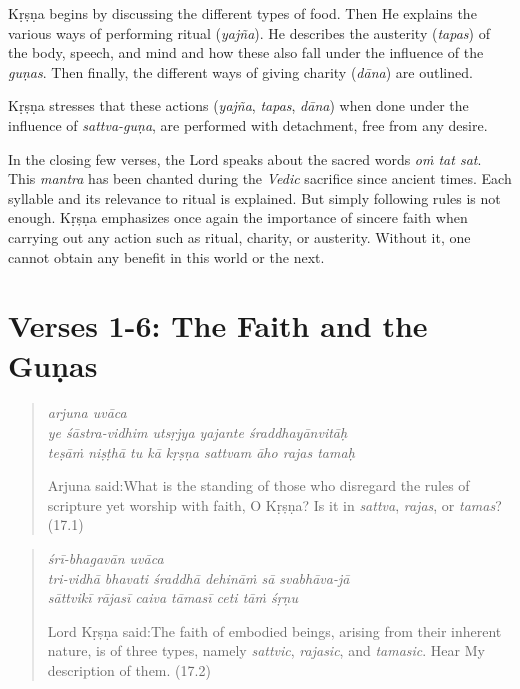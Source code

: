\documentclass[12pt, twoside, openright]{memoir}
\begin{document}
Kṛṣṇa begins by discussing the different types of food. Then He explains the various ways of performing ritual (\textit{yajña}). He describes the austerity (\textit{tapas}) of the body, speech, and mind and how these also fall under the influence of the \textit{guṇas}. Then finally, the different ways of giving charity (\textit{dāna}) are outlined.

Kṛṣṇa stresses that these actions (\textit{yajña}, \textit{tapas}, \textit{dāna}) when done under the influence of \textit{sattva-guṇa}, are performed with detachment, free from any desire.

In the closing few verses, the Lord speaks about the sacred words \textit{oṁ tat sat}. This \textit{mantra} has been chanted during the \textit{Vedic} sacrifice since ancient times. Each syllable and its relevance to ritual is explained. But simply following rules is not enough. Kṛṣṇa emphasizes once again the importance of sincere faith when carrying out any action such as ritual, charity, or austerity. Without it, one cannot obtain any benefit in this world or the next.

\section{Verses 1-6: The Faith and the Guṇas}\label{sec-verses-1-6-the-faith-and-the-gunas}


\par
\begin{verse}
\textit{arjuna uvāca} \\
\textit{ye śāstra-vidhim utsṛjya yajante śraddhayānvitāḥ} \\
\textit{teṣāṁ niṣṭhā tu kā kṛṣṇa sattvam āho rajas tamaḥ}

\noindent \quad Arjuna said:\linebreak What is the standing of those who disregard the rules of scripture yet worship with faith, O Kṛṣṇa? Is it in \textit{sattva}, \textit{rajas}, or \textit{tamas}? (17.1)
\end{verse}
\par



\par
\begin{verse}
\textit{śrī-bhagavān uvāca} \\
\textit{tri-vidhā bhavati śraddhā dehināṁ sā svabhāva-jā} \\
\textit{sāttvikī rājasī caiva tāmasī ceti tāṁ śṛṇu}

\noindent Lord Kṛṣṇa said:\linebreak The faith of embodied beings, arising from their inherent nature, is of three types, namely \textit{sattvic}, \textit{rajasic}, and \textit{tamasic}. Hear My description of them. (17.2)
\end{verse}
\par
\end{document}
